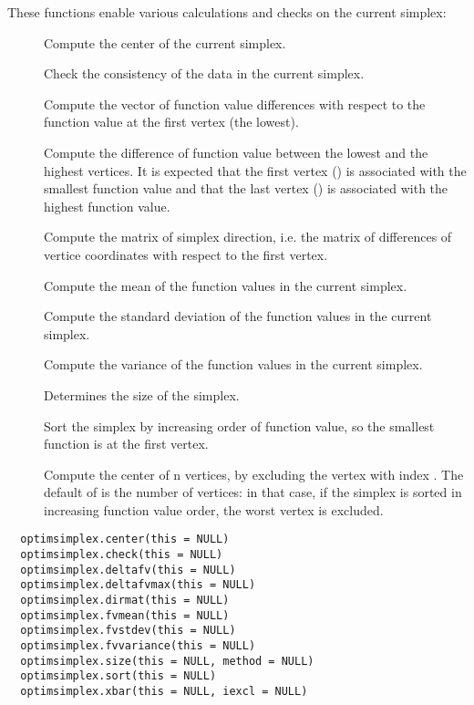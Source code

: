 \begin{Description}\relax
These functions enable various calculations and checks on the current simplex:
\begin{description}

\item[] Compute the center of the current
simplex.
\item[] Check the consistency of the data in the
current simplex.
\item[] Compute the vector of function value
differences with respect to the function value at the first vertex (the
lowest).
\item[] Compute the difference of function
value between the lowest and the highest vertices. It is expected that the
first vertex () is associated with the smallest function
value and that the last vertex () is associated with
the highest function value.
\item[] Compute the matrix of simplex direction,
i.e. the matrix of differences of vertice coordinates with respect to the
first vertex.
\item[] Compute the mean of the function values in
the current simplex.
\item[] Compute the standard deviation of the
function values in the current simplex.
\item[] Compute the variance of the function
values in the current simplex.
\item[] Determines the size of the simplex.
\item[] Sort the simplex by increasing order of
function value, so the smallest function is at the first vertex.
\item[] Compute the center of n vertices, by
excluding the vertex with index . The default of 
is the number of vertices: in that case, if the simplex is sorted in
increasing function value order, the worst vertex is excluded.

\end{description}

\end{Description}
%
\begin{Usage}
\begin{verbatim}
  optimsimplex.center(this = NULL)
  optimsimplex.check(this = NULL)
  optimsimplex.deltafv(this = NULL)
  optimsimplex.deltafvmax(this = NULL)
  optimsimplex.dirmat(this = NULL)
  optimsimplex.fvmean(this = NULL)
  optimsimplex.fvstdev(this = NULL)
  optimsimplex.fvvariance(this = NULL)
  optimsimplex.size(this = NULL, method = NULL)
  optimsimplex.sort(this = NULL)
  optimsimplex.xbar(this = NULL, iexcl = NULL)
\end{verbatim}
\end{Usage}
